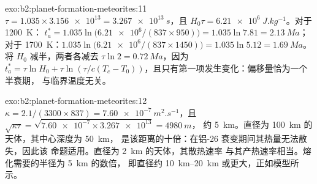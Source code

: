 \begin{solution}{exo:b2:planet-formation-meteorites:11}
$\tau = 1.035\times\num{3.156e13} = \qty{3.267e13}{s}$，且
$H_0\tau = \qty{6.21e6}{J.kg^{-1}}$。对于 \qty{1200}{K}：
$t_a^* = 1.035\ln\bigl(\num{6.21e6}/(837\times950)\bigr) = 1.035\ln7.81 =
\qty{2.13}{Ma}$；对于 \qty{1700}{K}：$1.035\ln\bigl(\num{6.21e6}/(837\times1450)\bigr)
= 1.035\ln5.12 = \qty{1.69}{Ma}$。将 $H_0$ 减半，两者各减去 $\tau\ln2 =
\qty{0.72}{Ma}$，因为 $t_a^* = \tau\ln H_0 + \tau\ln(\tau/c(T_c -
T_0))$，且只有第一项发生变化：偏移量恰为一个半衰期，
与临界温度无关。
\end{solution}

\begin{solution}{exo:b2:planet-formation-meteorites:12}
$\kappa = 2.1/(3300\times837) = \qty{7.60e-7}{m^2.s^{-1}}$，且
$\sqrt{\kappa\tau} = \sqrt{\num{7.60e-7}\times\num{3.267e13}} = \qty{4980}{m}$，
约 \qty{5}{km}。直径为 \qty{100}{km} 的天体，其中心深度为 \qty{50}{km}，
是该距离的十倍：在铝-26 衰变期间其热量无法散失，因此该
命题适用。直径为 \qty{2}{km} 的天体，其散热速率
与其产热速率相当。熔化需要的半径为 \qty{5}{km} 的数倍，
即直径约 \qtyrange{10}{20}{km} 或更大，正如模型所示。
\end{solution}

